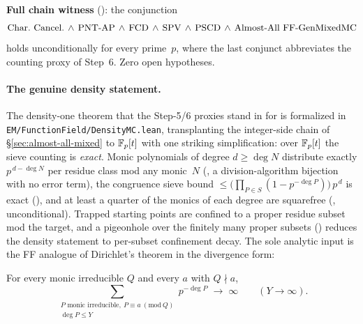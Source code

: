 \begin{keyresult}
\textbf{Full chain witness}
():
the conjunction
\[
  \text{Char.\ Cancel.} \,\wedge\, \text{PNT-AP} \,\wedge\, \mathrm{FCD}
  \,\wedge\, \mathrm{SPV} \,\wedge\, \mathrm{PSCD} \,\wedge\,
  \text{Almost-All FF-GenMixedMC}
\]
holds unconditionally for every prime~$p$, where the last conjunct
abbreviates the counting proxy of Step~6.  Zero open hypotheses.
\end{keyresult}

\paragraph{The genuine density statement.}
The density-one theorem that the Step-5/6 proxies stand in for is
formalized in \texttt{EM/FunctionField/DensityMC.lean}, transplanting
the integer-side chain of \S\ref{sec:almost-all-mixed} to $\mathbb{F}_p[t]$
with one striking simplification: over $\mathbb{F}_p[t]$ the sieve counting is
\emph{exact}.  Monic polynomials of degree $d \geq \deg N$ distribute
exactly $p^{\,d - \deg N}$ per residue class mod any monic~$N$
(,
a division-algorithm bijection with no error term), the congruence
sieve bound
$\leq \bigl(\prod_{P \in S}(1 - p^{-\deg P})\bigr)\,p^{\,d}$
is exact
(),
and at least a quarter of the monics of each degree are squarefree
(,
unconditional).  Trapped starting points are confined to a proper
residue subset mod the target, and a pigeonhole over the finitely many
proper subsets
()
reduces the density statement to per-subset confinement decay.  The
sole analytic input is the FF analogue of Dirichlet's theorem in the
divergence form:

\begin{property}
For every monic irreducible $Q$ and every $a$ with $Q \nmid a$,
\[
  \sum_{\substack{P \text{ monic irreducible},\ P \equiv a \ (\mathrm{mod}\ Q) \\ \deg P \leq Y}}
    p^{-\deg P} \;\longrightarrow\; \infty
  \qquad (Y \to \infty).
\]
\end{property}

